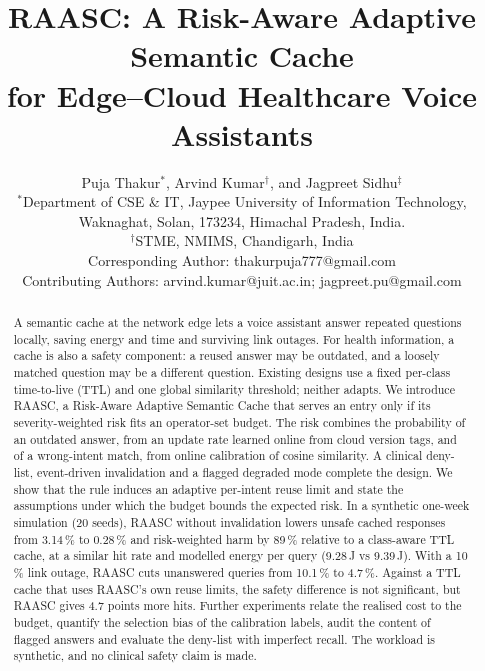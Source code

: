 \documentclass[journal]{IEEEtran}
\newcommand{\pct}{\,\%}
\begin{document}
\title{RAASC: A Risk-Aware Adaptive Semantic Cache\\ for Edge--Cloud Healthcare Voice Assistants}

\author{Puja Thakur$^{*}$, Arvind Kumar$^{\dagger}$, and Jagpreet Sidhu$^{\ddagger}$\\
$^{*}$Department of CSE \& IT, Jaypee University of Information Technology, Waknaghat, Solan, 173234, Himachal Pradesh, India.\\
$^{\dagger}$STME, NMIMS, Chandigarh, India\\
Corresponding Author: thakurpuja777@gmail.com\\
Contributing Authors: arvind.kumar@juit.ac.in; jagpreet.pu@gmail.com}

\maketitle

\begin{abstract}
A semantic cache at the network edge lets a voice assistant answer repeated questions locally, saving energy and time and surviving link outages. For health information, a cache is also a safety component: a reused answer may be outdated, and a loosely matched question may be a different question. Existing designs use a fixed per-class time-to-live (TTL) and one global similarity threshold; neither adapts. We introduce RAASC, a Risk-Aware Adaptive Semantic Cache that serves an entry only if its severity-weighted risk fits an operator-set budget. The risk combines the probability of an outdated answer, from an update rate learned online from cloud version tags, and of a wrong-intent match, from online calibration of cosine similarity. A clinical deny-list, event-driven invalidation and a flagged degraded mode complete the design. We show that the rule induces an adaptive per-intent reuse limit and state the assumptions under which the budget bounds the expected risk. In a synthetic one-week simulation (20 seeds), RAASC without invalidation lowers unsafe cached responses from 3.14\pct{} to 0.28\pct{} and risk-weighted harm by 89\pct{} relative to a class-aware TTL cache, at a similar hit rate and modelled energy per query (9.28\,J vs 9.39\,J). With a 10\pct{} link outage, RAASC cuts unanswered queries from 10.1\pct{} to 4.7\pct{}. Against a TTL cache that uses RAASC's own reuse limits, the safety difference is not significant, but RAASC gives 4.7 points more hits. Further experiments relate the realised cost to the budget, quantify the selection bias of the calibration labels, audit the content of flagged answers and evaluate the deny-list with imperfect recall. The workload is synthetic, and no clinical safety claim is made.
\end{abstract}
\end{document}
